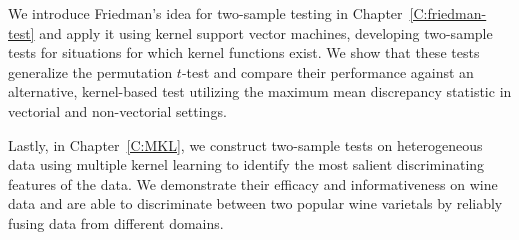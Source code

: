 We introduce Friedman's idea for two-sample testing in
Chapter~\ref{C:friedman-test} and apply it using kernel support vector
machines, developing two-sample tests for situations for which
kernel functions exist.  We show that these tests generalize the
permutation $t$-test and compare their performance against an
alternative, kernel-based test utilizing the maximum mean discrepancy
statistic in vectorial and non-vectorial settings.

Lastly, in Chapter~\ref{C:MKL}, we construct two-sample tests on
heterogeneous data using multiple kernel learning to identify the most
salient discriminating features of the data.  We demonstrate their
efficacy and informativeness on wine data and are able to discriminate
between two popular wine varietals by reliably fusing data from
different domains.